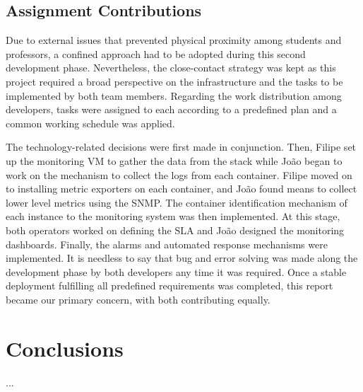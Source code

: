 \documentclass[12pt]{article}
\begin{document}
\subsection{Assignment Contributions} \label{remarks.contributions} %


Due to external issues that prevented physical proximity among students and professors, a confined approach had to be adopted during this second development phase.
Nevertheless, the close-contact strategy was kept as this project required a broad perspective on the infrastructure and the tasks to be implemented by both team members.
Regarding the work distribution among developers, tasks were assigned to each according to a predefined plan and a common working schedule was applied. 

The technology-related decisions were first made in conjunction.
Then, Filipe set up the monitoring VM to gather the data from the stack while João began to work on the mechanism to collect the logs from each container.
Filipe moved on to installing metric exporters on each container, and João found means to collect lower level metrics using the SNMP.
The container identification mechanism of each instance to the monitoring system was then implemented.
At this stage, both operators worked on defining the SLA and João designed the monitoring dashboards.
Finally, the alarms and automated response mechanisms were implemented.
It is needless to say that bug and error solving was made along the development phase by both developers any time it was required.
Once a stable deployment fulfilling all predefined requirements was completed, this report became our primary concern, with both contributing equally.

\newpage
\section*{Conclusions} \label{conclusions} %

...
\end{document}
